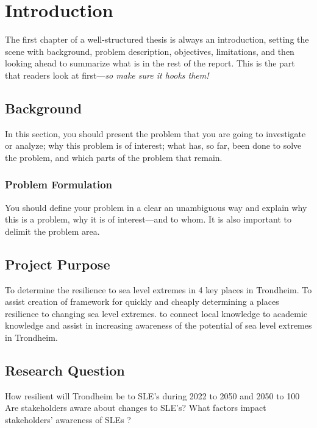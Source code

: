 \chapter{Introduction}
The first chapter of a well-structured thesis is always an introduction, setting the scene with background, problem description, objectives, limitations, and then looking ahead to summarize what is in the rest of the report. This is the part that readers look at first---\emph{so make sure it hooks them!}



\section{Background}
In this section, you should present the problem that you are going to investigate or analyze; why this problem is of interest; what has, so far, been done to solve the problem, and which parts of the problem that remain.
\subsection*{Problem Formulation}
You should define your problem in a clear an unambiguous way and explain why this is a problem, why it is of interest---and to whom. It is also important to delimit the problem area.

\section{Project Purpose}
To determine the resilience to sea level extremes in 4 key places in Trondheim. To assist creation of framework for quickly and cheaply determining a places resilience to changing sea level extremes. to connect local knowledge to academic knowledge and assist in increasing awareness of the potential of sea level extremes in Trondheim. 

\section{Research Question}
 How resilient will Trondheim be to SLE’s during 2022 to 2050 and 2050 to 100
Are stakeholders aware about changes to SLE’s?
What factors impact stakeholders’ awareness of SLEs ?


